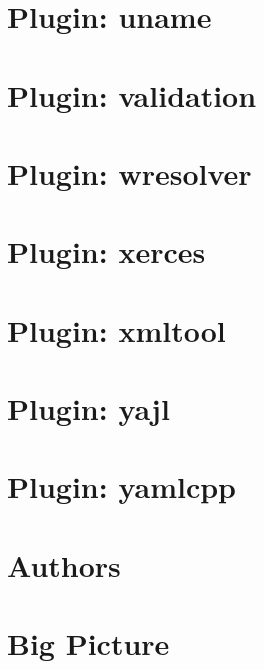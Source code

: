 \documentclass[twoside]{book}
\newcommand{\+}{\discretionary{\mbox{\scriptsize$\hookleftarrow$}}{}{}}
\begin{document}
\chapter{Plugin\+: uname}
\label{md_src_plugins_uname_README}

\chapter{Plugin\+: validation}
\label{md_src_plugins_validation_README}

\chapter{Plugin\+: wresolver}
\label{md_src_plugins_wresolver_README}

\chapter{Plugin\+: xerces}
\label{md_src_plugins_xerces_README}

\chapter{Plugin\+: xmltool}
\label{md_src_plugins_xmltool_README}

\chapter{Plugin\+: yajl}
\label{md_src_plugins_yajl_README}

\chapter{Plugin\+: yamlcpp}
\label{md_src_plugins_yamlcpp_README}

\chapter{Authors}
\label{doc_AUTHORS_md}

\chapter{Big Picture}
\label{doc_BIGPICTURE_md}

\end{document}

